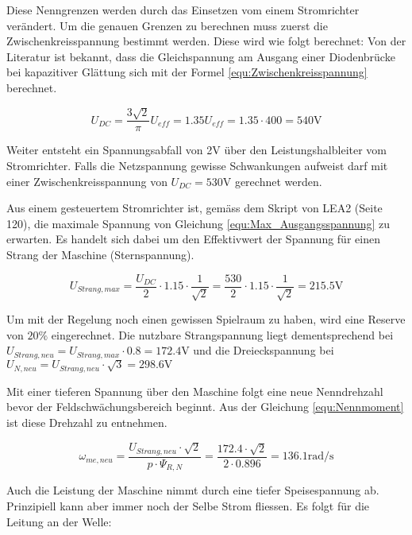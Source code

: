 Diese Nenngrenzen werden durch das Einsetzen vom einem Stromrichter verändert. Um die genauen Grenzen zu berechnen muss zuerst die Zwischenkreisspannung bestimmt werden. Diese wird wie folgt berechnet:
Von der Literatur ist bekannt, dass die Gleichspannung am Ausgang einer Diodenbrücke bei kapazitiver Glättung sich mit der Formel \ref{equ:Zwischenkreisspannung} berechnet.

\begin{equation}\label{equ:Zwischenkreisspannung}
U_{DC} = \frac{3\sqrt{2}}{\pi} U_{eff} = 1.35 U_{eff} = 1.35 \cdot 400 = 540 \mathrm{V}
\end{equation}

Weiter entsteht ein Spannungsabfall von 2V über den Leistungshalbleiter vom Stromrichter. Falls die Netzspannung gewisse Schwankungen aufweist darf mit einer Zwischenkreisspannung von $U_{DC} = 530 \mathrm{V}$ gerechnet werden. 

Aus einem gesteuertem Stromrichter ist, gemäss dem Skript von LEA2 (Seite 120), die maximale Spannung von Gleichung \ref{equ:Max_Ausgangsspannung} zu erwarten. Es handelt sich dabei um den Effektivwert der Spannung für einen Strang der Maschine (Sternspannung).

\begin{equation}\label{equ:Max_Ausgangsspannung}
U_{Strang,max} = \frac{U_{DC}}{2} \cdot 1.15 \cdot \frac{1}{\sqrt{2}} = \frac{530}{2} \cdot 1.15 \cdot \frac{1}{\sqrt{2}} = 215.5 \mathrm{V}
\end{equation}

Um mit der Regelung noch einen gewissen Spielraum zu haben, wird eine Reserve von $20\%$ eingerechnet. Die nutzbare Strangspannung liegt dementsprechend bei $U_{Strang,neu} = U_{Strang,max} \cdot 0.8 = 172.4 \mathrm{V}$ 
und die Dreieckspannung bei $U_{N,neu} = U_{Strang,neu} \cdot \sqrt{3} = 298.6 \mathrm{V}$

Mit einer tieferen Spannung über den Maschine folgt eine neue Nenndrehzahl bevor der Feldschwächungsbereich beginnt. Aus der Gleichung \ref{equ:Nennmoment} ist diese Drehzahl zu entnehmen.

\begin{equation}\label{equ:Nenndrehzahl_neu}
\omega _{me,neu} = \frac{U_{Strang,neu} \cdot \sqrt{2}}{p \cdot \Psi_{R,N}} = \frac{172.4 \cdot \sqrt{2}}{2 \cdot 0.896} = 136.1 \mathrm{rad/s}
\end{equation}

Auch die Leistung der Maschine nimmt durch eine tiefer Speisespannung ab. Prinzipiell kann aber immer noch der Selbe Strom fliessen. Es folgt für die Leitung an der Welle:

